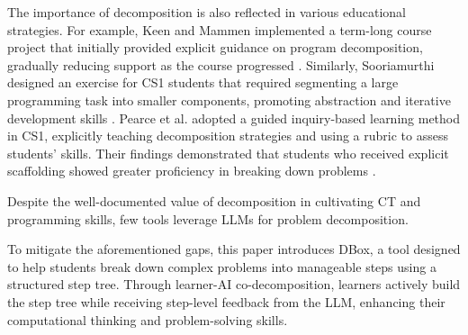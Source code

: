 The importance of decomposition is also reflected in various educational strategies. For example, Keen and Mammen implemented a term-long course project that initially provided explicit guidance on program decomposition, gradually reducing support as the course progressed \cite{keen2015program}. Similarly, Sooriamurthi designed an exercise for CS1 students that required segmenting a large programming task into smaller components, promoting abstraction and iterative development skills \cite{sooriamurthi2009introducing}. Pearce et al. adopted a guided inquiry-based learning method in CS1, explicitly teaching decomposition strategies and using a rubric to assess students’ skills. Their findings demonstrated that students who received explicit scaffolding showed greater proficiency in breaking down problems \cite{pearce2015improving}.

Despite the well-documented value of decomposition in cultivating CT and programming skills, few tools leverage LLMs for problem decomposition. 

To mitigate the aforementioned gaps, this paper introduces DBox, a tool designed to help students break down complex problems into manageable steps using a structured step tree. Through learner-AI co-decomposition, learners actively build the step tree while receiving step-level feedback from the LLM, enhancing their computational thinking and problem-solving skills.